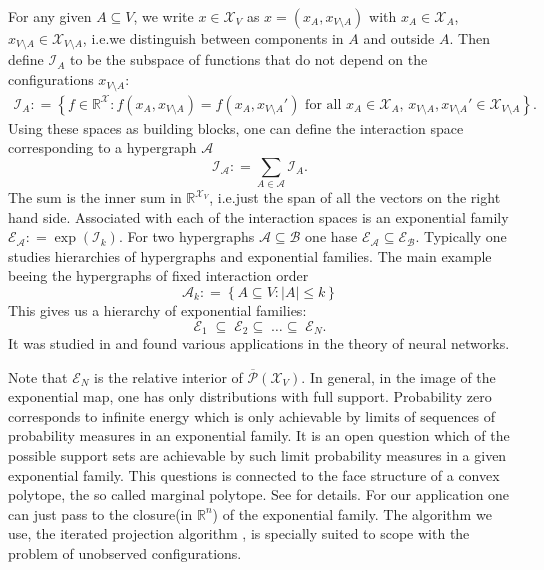 \documentclass[12pt]{amsart}
\newcommand{\set}[1]{\left\lbrace #1 \right\rbrace} %
\newcommand{\defas}{\mathrel{\mathop{:}}=}   %
\renewcommand{\subset}{\subseteq}  %
\providecommand{\abs}[1]{\left\lvert#1\right\rvert}
\newcommand{\ie}{i.e.\;}  %
\theoremstyle{plain}%
\theoremstyle{definition}
\theoremstyle{remark}
\begin{document}
For any given $A\subset V$, we
write $x\in \mathcal{X}_V$ as $x = (x_A,x_{V\setminus
  A})$ with $x_A\in \mathcal{X}_A$, $x_{V \setminus
  A}\in\mathcal{X}_{V \setminus A}$, \ie we distinguish between components in
  $A$ and outside $A$. Then define ${\mathcal I}_A$ to be the
subspace of functions that do not depend on the configurations
$x_{V \setminus A}$:
\begin{align*}
  {\mathcal I}_A \defas \left\{ f \in {\mathbb R}^\mathcal{X} : 
    f(x_A,x_{V \setminus A}) = f(x_A, x_{V
      \setminus A}') \mbox{ for all $x_A \in \mathcal{X}_A$, $x_{V \setminus A}, 
      x_{V \setminus A}' \in \mathcal{X}_{V
        \setminus A}$} \right\}.
\end{align*}
Using these spaces as building blocks, one can define the interaction
space corresponding to a hypergraph $\mathcal{A}$ 
\[
{\mathcal I}_\mathcal{A} \defas \sum_{ A \in \mathcal{A} } {\mathcal I}_A.
\]
The sum is the inner sum in $\mathbb{R}^{\mathcal{X}_V}$, \ie just the span of all
the vectors on the right hand side.
Associated with each of the interaction spaces is an exponential family
$\mathcal{E}_{\mathcal{A}}
\defas \exp(\mathcal{I}_k)$. For two hypergraphs $\mathcal{A} \subset
\mathcal{B}$ one hase $\mathcal{E}_{\mathcal{A}}\subset
\mathcal{E}_{\mathcal{B}}$. Typically one studies hierarchies of hypergraphs and
exponential families\cite{KahOlbJosAy08}. The main example beeing the
hypergraphs of fixed interaction order 
\begin{equation*}
  \mathcal{A}_k \defas \set{A\subset V : \abs{A} \leq k}  
\end{equation*}
This gives us a hierarchy of exponential families: 
\[ {\mathcal E}_{1} \; \subseteq \;
{\mathcal E}_{2} \subseteq \; \dots \subseteq \; {\mathcal E}_{N}.
\] 
It was studied in \cite{Amari01,ayknauf06} and found various
applications in the theory of neural networks. 

Note that $\mathcal{E}_N$ is the relative interior of
$\overline{\mathcal{P}}(\mathcal{X}_V)$. In general, in the image of the
exponential map, one has only distributions with full support. Probability
zero corresponds to infinite energy which is only achievable by 
limits of sequences of probability measures in an exponential family. It is an
open question which of the possible support sets are achievable by such limit
probability measures in a given exponential family. This questions is connected to
the face structure of a convex polytope, the so called marginal polytope. See
\cite{CziMa02,kahleay06} for details.
For our application one can just pass to the closure(in $\mathbb{R}^n$) 
of the exponential family. The algorithm we use, the iterated projection
algorithm \cite{csiszarshields04}, is specially suited to scope
with the problem of unobserved configurations. 
\end{document}
